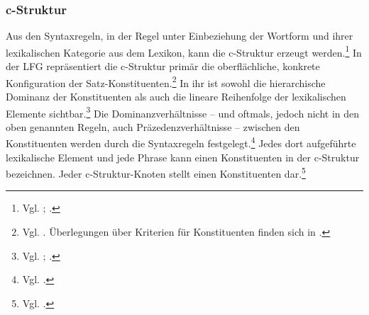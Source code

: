 \documentclass[12pt,a4paper]{article}
\begin{document}








\subsubsection{c-Struktur}
Aus den Syntaxregeln, in der Regel unter Einbeziehung der Wortform und ihrer lexikalischen Kategorie aus dem Lexikon, kann die c-Struktur erzeugt werden.\footnote{Vgl. \cite[14]{Rohrer}; \cite[6]{Skript}.} In der LFG repräsentiert die c-Struktur primär die oberflächliche, konkrete Konfiguration der Satz-Konstituenten.\footnote{Vgl. \cite[47]{Dal}. Überlegungen über Kriterien für Konstituenten finden sich in \cite[48-9]{Dal}.} In ihr ist sowohl die hierarchische Dominanz der Konstituenten als auch die lineare Reihenfolge der lexikalischen Elemente sichtbar.\footnote{Vgl. \cite[7]{Dal}; \cite[13]{Rohrer}.} Die Dominanzverhältnisse -- und oftmals, jedoch nicht in den oben genannten Regeln, auch Präzedenzverhältnisse -- zwischen den Konstituenten werden durch die Syntaxregeln festgelegt.\footnote{Vgl. \cite[19]{Rohrer}.} Jedes dort aufgeführte lexikalische Element und jede Phrase kann einen Konstituenten in der c-Struktur bezeichnen. Jeder c-Struktur-Knoten stellt einen Konstituenten dar.\footnote{Vgl. \cite[5]{Skript}.} 
\end{document}
